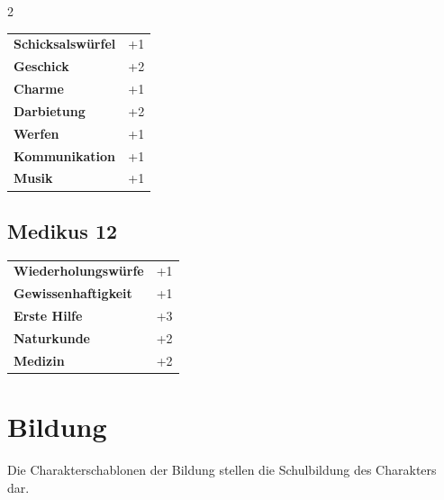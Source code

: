 \begin{multicols}{2}
\begin{tcolorbox}
\begin{tabular}{@{}ll@{}}
    \textbf{Schicksalswürfel} & +1\\
    \textbf{Geschick} & +2\\
    \textbf{Charme} & +1\\
    \textbf{Darbietung} & +2\\
    \textbf{Werfen} & +1\\
    \textbf{Kommunikation} & +1\\
    \textbf{Musik} & +1\\
\end{tabular}


\end{tcolorbox}

\begin{tcolorbox}
    \subsection*{Medikus \hfill \small{12 }}
    \tcblower




\begin{tabular}{@{}ll@{}}
    \textbf{Wiederholungswürfe} & +1\\
    \textbf{Gewissenhaftigkeit} & +1\\
    \textbf{Erste Hilfe} & +3\\
    \textbf{Naturkunde} & +2\\
    \textbf{Medizin} & +2\\
\end{tabular}


\end{tcolorbox}

\section{Bildung}

Die Charakterschablonen der Bildung stellen die Schulbildung des Charakters dar.

\begin{tcolorbox}

\end{tcolorbox}
\end{multicols}
